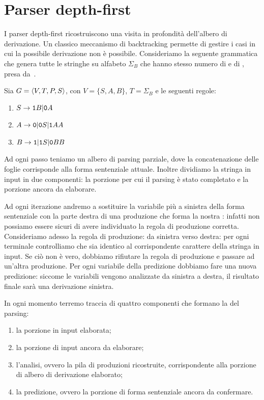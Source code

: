 \section{Parser depth-first}\label{sec:parser-DFS}

I parser depth-first ricostruiscono una visita in profondità dell'albero di derivazione.
Un classico meccanismo di backtracking permette di gestire i casi in cui la possibile derivazione non è possibile.
Consideriamo la seguente grammatica che genera tutte le stringhe su alfabeto $\Sigma_{B}$ che hanno stesso numero di
\zero e di \uno, presa da~\cite{grune-book}.


\begin{example}\label{exa:cfg-01-stesso-numero}
Sia $G=\langle V, T, P, S \rangle$, con $V=\{S, A, B\}$, $T=\Sigma_{B}$ e le seguenti regole:
\begin{enumerate}
\item $S\to  \mathtt{1} B | \mathtt{0} A$
\item $A\to \mathtt{0} | \mathtt{0} S | \mathtt{1} A A$
\item $B\to \mathtt{1} | \mathtt{1} S | \mathtt{0} BB$
\end{enumerate}
\end{example}

Ad ogni passo teniamo un albero di parsing parziale, dove la concatenazione delle foglie corrisponde alla forma
sentenziale attuale.
Inoltre dividiamo la stringa in input in due componenti: la porzione per cui il parsing è stato completato e la porzione
ancora da elaborare.

Ad ogni iterazione andremo a sostituire la variabile più a sinistra della forma sentenziale con la parte destra di una
produzione che forma la nostra : infatti non possiamo essere sicuri di avere individuato la
regola di produzione corretta.
Consideriamo adesso la regola di produzione: da sinistra verso destra: per ogni terminale controlliamo che sia identico al
corrispondente carattere della stringa in input.
Se ciò non è vero, dobbiamo rifiutare la regola di produzione e passare ad un'altra produzione.
Per ogni variabile della predizione dobbiamo fare una nuova predizione: siccome le variabili vengono analizzate da
sinistra a destra, il risultato finale sarà una derivazione sinistra.

In ogni momento terremo traccia di quattro componenti che formano la  del parsing:
\begin{enumerate}
\item la porzione in input elaborata;
\item la porzione di input ancora da elaborare;
\item l'analisi, ovvero la pila di produzioni ricostruite, corrispondente alla porzione di albero di derivazione elaborato;
\item la predizione, ovvero la porzione di forma sentenziale ancora da confermare.
\end{enumerate}

